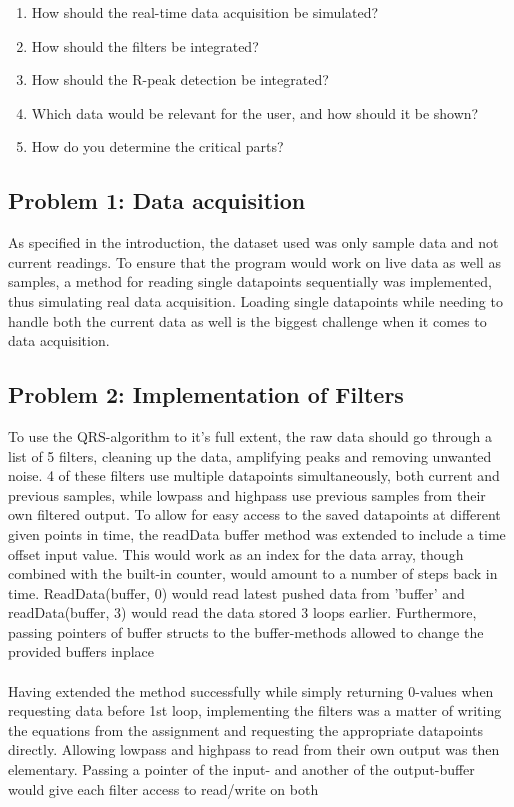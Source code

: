\documentclass[12pt,a4paper]{article}
\begin{document}
 	\begin{enumerate}
	\item How should the real-time data acquisition be simulated?
	\item How should the filters be integrated?
	\item How should the R-peak detection be integrated?
	\item Which data would be relevant for the user, and how should it be shown?
	\item How do you determine the critical parts?
\end{enumerate}

\subsection{Problem 1: Data acquisition}
	As specified in the introduction, the dataset used was only sample data and not current readings. To ensure that the program would work on live data as well as samples, a method for reading single datapoints sequentially was implemented, thus simulating real data acquisition. Loading single datapoints while needing to handle both the current data as well is the biggest challenge when it comes to data acquisition.\\
	
\subsection{Problem 2: Implementation of Filters}
	To use the QRS-algorithm to it's full extent, the raw data should go through a list of 5 filters, cleaning up the data, amplifying peaks and removing unwanted noise. 4 of these filters use multiple datapoints simultaneously, both current and previous samples, while lowpass and highpass use previous samples from their own filtered output. To allow for easy access to the saved datapoints at different given points in time, the readData buffer method was extended to include a time offset input value. This would work as an index for the data array, though combined with the built-in counter, would amount to a number of steps back in time. ReadData(buffer, 0) would read latest pushed data from 'buffer' and readData(buffer, 3) would read the data stored 3 loops earlier. Furthermore, passing pointers of buffer structs to the buffer-methods allowed to change the provided buffers inplace\\
\\	
Having extended the method successfully while simply returning 0-values when requesting data before 1st loop, implementing the filters was a matter of writing the equations from the assignment and requesting the appropriate datapoints directly.
	Allowing lowpass and highpass to read from their own output was then elementary. Passing a pointer of the input- and another of the output-buffer would give each filter access to read/write on both\\
\end{document}
